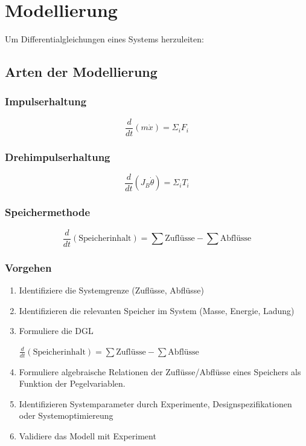 
\section{Modellierung}
    Um Differentialgleichungen eines Systems herzuleiten:
    \subsection{Arten der Modellierung}
        \subsubsection{Impulserhaltung}
            \[\frac{d}{dt}(m\dot{x}) = \Sigma_i F_i\]
        \subsubsection{Drehimpulserhaltung}
             \[\frac{d}{dt}(J_B\dot{\theta})= \Sigma_i T_i\]
        \subsubsection{Speichermethode}
          \[\frac{d}{dt}(\textrm{Speicherinhalt}) = \sum \textrm{Zuflüsse} - \sum \textrm{Abflüsse}\]
		\subsubsection{Vorgehen}
		    \begin{enumerate}
    		       
    		    \item  Identifiziere die Systemgrenze (Zuflüsse, Abflüsse)
    
    		    \item  Identifizieren die relevanten Speicher im System (Masse, Energie, Ladung) 
    
    		    \item  Formuliere die DGL
    
     			    $\frac{d}{dt}(\textrm{Speicherinhalt}) = \sum \textrm{Zuflüsse} - \sum \textrm{Abflüsse}$
    
    	    	\item  Formuliere algebraische Relationen der Zuflüsse/Abflüsse eines Speichers als Funktion der Pegelvariablen. %
    
    	    	\item  Identifizieren Systemparameter durch Experimente, Designspezifikationen oder Systemoptimiereung
    
    	    	\item  Validiere das Modell mit Experiment
		    \end{enumerate}

